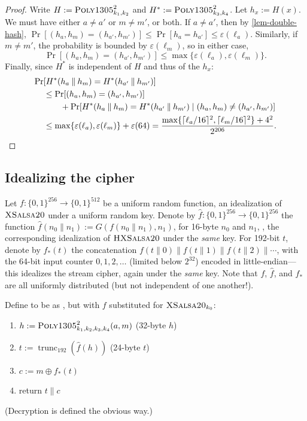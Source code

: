\documentclass[draft]{article}
\newcommand{\term}[1]{\textbf{#1}}
\DeclareRobustCommand{\operatorsc}[1]{{%
  \ifmmode\let\next=\operatorname\else\let\next=\relax\fi\next{\textsc{#1}}}}
\def\XSalsa#1/{\operatorsc{XSalsa#1}}
\def\HXSalsa#1/{\operatorsc{HXSalsa#1}}
\def\Poly#1/{\operatorsc{Poly#1}}
\def\Daence/{\operatorsc{Daence}}
\def\Deuce/{\operatorsc{Deuce}}
\DeclareMathOperator{\trunc}{trunc}
\newcommand{\concat}{\mathbin\|}
\newcommand{\given}{\mathrel|}
\newcommand{\collisionbound}{\varepsilon}
\begin{document}
\begin{proof}
  Write
   $H := \Poly1305/^2_{k_1,k_2}$ and
   $H^* := \Poly1305/^2_{k_3,k_4}$.
  Let $h_x := H(x)$.
  We must have either $a \ne a'$ or $m \ne m'$, or both.
  If $a \ne a'$, then by \autoref{lem-double-hash},
   $\Pr[(h_a, h_m) = (h_{a'}, h_{m'})]
    \leq \Pr[h_a = h_{a'}]
    \leq \collisionbound(\ell_a)$.
  Similarly, if $m \ne m'$, the probability is bounded by
   $\collisionbound(\ell_m)$,
   so in either case,
  \[
    \Pr[(h_a, h_m) = (h_{a'}, h_{m'})]
    \leq \max\{\collisionbound(\ell_a), \collisionbound(\ell_m)\}.
  \]
  Finally, since $H^*$ is independent of $H$ and thus of the $h_x$:
%
  \begin{align*}
    \Pr&[H^*(h_a \concat h_m) = H^*(h_{a'} \concat h_{m'})] \\
    &\leq \Pr[(h_a, h_m) = (h_{a'}, h_{m'})] \\
    &\qquad
          + \Pr[H^*(h_a \concat h_m) = H^*(h_{a'} \concat h_{m'})
                \given (h_a, h_m) \ne (h_{a'}, h_{m'})] \\
    &\leq \max\{\collisionbound(\ell_a), \collisionbound(\ell_m)\}
          + \collisionbound(64)
     = \frac{\max\{\lceil\ell_a/16\rceil^2, \lceil\ell_m/16\rceil^2\}
             + 4^2}
            {2^{206}}.
    \qedhere
  \end{align*}
\end{proof}

\newpage

\subsection{Idealizing the cipher}

Let $f\colon \{0,1\}^{256} \to \{0,1\}^{512}$ be a uniform random
 function, an idealization of $\XSalsa20/$ under a uniform random key.
Denote by
 $\hat f\colon \{0,1\}^{256} \to \{0,1\}^{256}$
 the function
 $\hat f(n_0 \concat n_1) := G(f(n_0 \concat n_1), n_1)$,
 for 16-byte $n_0$ and $n_1$,
 \ie, the corresponding idealization of $\HXSalsa20/$ under the
 \emph{same} key.
For 192-bit $t$, denote by $f_*(t)$ the concatenation
 $f(t \concat 0) \concat f(t \concat 1) \concat f(t \concat 2) \concat \dotsb$,
 with the 64-bit input counter $0, 1, 2, \dotsc$
 (limited below $2^{32}$)
 encoded in little-endian---this idealizes the \XSalsa20/ stream
 cipher, again under the \emph{same} key.
Note that $f$, $\hat f$, and $f_*$ are all uniformly distributed
 (but not independent of one another!).

Define \term{\Deuce/} to be as \Daence/, but with $f$ substituted for
 $\XSalsa20/_{k_0}$:
%
\begin{enumerate}
  \item $h := \Poly1305/^2_{k_1,k_2,k_3,k_4}(a, m)$
    \hfill (32-byte $h$)
  \item $t := \trunc_{192}(\hat f(h))$
    \hfill (24-byte $t$)
  \item $c := m \oplus f_*(t)$
  \item return $t \concat c$
\end{enumerate}
%
(Decryption is defined the obvious way.)
\end{document}

